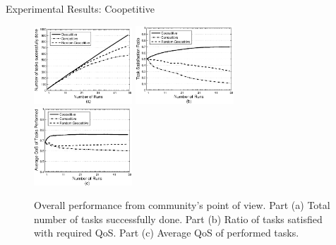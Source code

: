 \documentclass{beamer}
\begin{document}
\begin{frame}{Experimental Results: Coopetitive}
    \begin{figure}[h]
        \centering
        \includegraphics[width=1.45in]{figures/graphtaskdone.eps}
        \includegraphics[width=1.45in]{figures/graphtasksatisfaction.eps}
        \includegraphics[width=1.45in]{figures/graphavgqostask.eps}
        \caption{Overall performance from community's point of view. Part
        (a) Total number of tasks successfully done. Part (b) Ratio of
        tasks satisfied with required QoS. Part (c) Average QoS of
        performed tasks.} \label{graph_task}
    \end{figure}
\end{frame}
\end{document}
